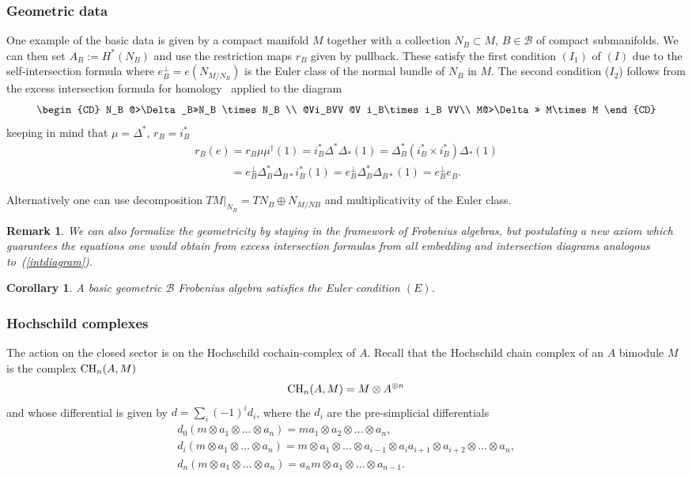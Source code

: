 \documentclass[pdftex]{sigma}
\newtheorem{cor}[thm]{Corollary}
\newtheorem{rmk}[thm]{Remark}
\def\calB{{\mathcal B}}
\def\res{r}
\def\oto{\otimes \dots \otimes}
\newcommand{\aoa}[2]{a_{#1}\otimes \dots \otimes a_{#2}}
\begin{document}
\subsubsection{Geometric data}
\label{geodatasection} One example of the basic data is given by a
compact manifold $M$ together with a collection $N_B\subset M$, $B\in
\calB$ of compact submanifolds. We can then set $A_B:=H^*(N_B)$ and
use the restriction maps $r_B$     given by pullback. These satisfy
the f\/irst  condition $(I_1)$ of $(I)$ due to the self-intersection
formula where $e_B^{\perp}=e(N_{M/N_B})$ is the Euler class of the
normal bundle of $N_B$ in $M$. The second condition ($I_2$) follows
from the excess intersection formula for homology~\cite{Qu} applied
to the diagram
\begin{equation}
\label{intdiagram}
\begin{CD}
N_B @>\Delta_B>>N_B \times N_B \\
@Vi_BVV @V i_B\times i_B VV\\
M@>\Delta>> M\times M
\end{CD}
\end{equation}
keeping in mind that $\mu=\Delta^{*}$, $\res_B=i_B^*$
\begin{gather*}
\res_B(e)=\res_B\mu\mu^{\dagger}(1)=i_B^*\Delta^*\Delta_*(1)=\Delta^*_B(i_{B}^*\times i_{B}^*)\Delta_*(1) \\
\phantom{\res_B(e)}{} =e_B^{\perp}\Delta_B^*\Delta_{B*}i_B^*(1)=e_B^{\perp}\Delta_B^*\Delta_{B*}(1)=
e^{\perp}_Be_B.
\end{gather*}

Alternatively one can use decomposition $TM|_{N_B}=TN_B\oplus N_{M/NB}$ and multiplicativity of the Euler class.

\begin{rmk}
We can also formalize the geometricity by  staying in the framework of Frobenius algebras, but
postulating a new axiom which guarantees the equations one would obtain from excess intersection formulas from all embedding and intersection diagrams analogous to~(\ref{intdiagram}).
\end{rmk}

\begin{cor}
A basic geometric $\calB$ Frobenius algebra satisfies the Euler condition $(E)$.
\end{cor}

\subsubsection{Hochschild complexes}
The action on the closed sector is on the Hochschild cochain-complex of $A$.
Recall that the Hochschild chain complex of an $A$ bimodule $M$ is the complex ${\rm CH}_n(A,M)$
\[
{\rm CH}_n(A,M)=M\otimes A^{\otimes n}
\]
and whose  dif\/ferential is given by $d=\sum_i (-1)^i d_i$,
where the $d_i$ are the pre-simplicial dif\/ferentials
\begin{gather*}
d_0 (m\otimes a_1 \oto a_n ) = m a_1 \otimes\aoa{2}{n},\\
d_i (m\otimes a_1 \oto a_n) = m\otimes \aoa{1}{i-1}\otimes a_{i}a_{i+1}\otimes
\aoa{i+2}{n}, \\
d_{n} ( m\otimes a_1 \oto a_n ) = a_n m\otimes\aoa{1}{n-1}.
\end{gather*}
\end{document}
